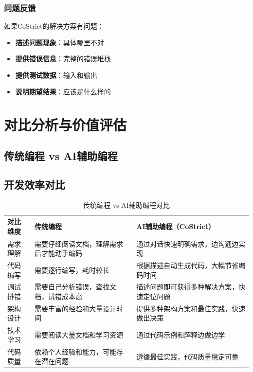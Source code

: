\documentclass[12pt,a4paper]{article}
\begin{document}
\begin{itemize}
\subsubsection{问题反馈}

如果CoStrict的解决方案有问题：

\begin{itemize}
    \item \textbf{描述问题现象}：具体哪里不对
    \item \textbf{提供错误信息}：完整的错误堆栈
    \item \textbf{提供测试数据}：输入和输出
    \item \textbf{说明期望结果}：应该是什么样的
\end{itemize}

\section{对比分析与价值评估}

\subsection{传统编程 vs AI辅助编程}

\subsection{开发效率对比}

\begin{table}[ht]
\centering
\begin{tabular}{|p{5cm}|p{5cm}|p{5cm}|}
\hline
\textbf{对比维度} & \textbf{传统编程} & \textbf{AI辅助编程（CoStrict）} \\
\hline
需求理解 & 需要仔细阅读文档，理解需求后才能动手编码 & 通过对话快速明确需求，边沟通边实现 \\
\hline
代码编写 & 需要逐行编写，耗时较长 & 根据描述自动生成代码，大幅节省编码时间 \\
\hline
调试排错 & 需要自己分析错误，查找文档，试错成本高 & 描述问题即可获得多种解决方案，快速定位问题 \\
\hline
架构设计 & 需要丰富的经验和大量设计时间 & 提供多种架构方案和最佳实践，快速做出决策 \\
\hline
技术学习 & 需要阅读大量文档和学习资源 & 通过代码示例和解释边做边学 \\
\hline
代码质量 & 依赖个人经验和能力，可能存在潜在问题 & 遵循最佳实践，代码质量稳定可靠 \\
\hline
\end{tabular}
\caption{传统编程 vs AI辅助编程对比}
\end{table}


\end{itemize}
\end{document}
